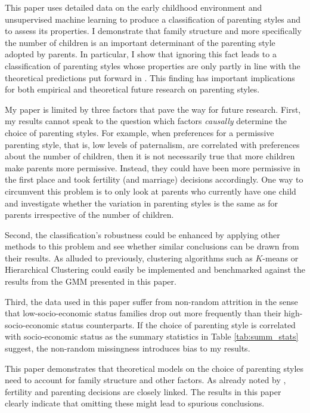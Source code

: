This paper uses detailed data on the early childhood environment and unsupervised machine learning to produce a classification of parenting styles and to assess its properties. I demonstrate that family structure and more specifically the number of children is an important determinant of the parenting style adopted by parents. In particular, I show that ignoring this fact leads to a classification of parenting styles whose properties are only partly in line with the theoretical predictions put forward in \textcites{doepkeParentingStyleAltruism2017}{doepkeEconomicsParenting2019}. This finding has important implications for both empirical and theoretical future research on parenting styles.

My paper is limited by three factors that pave the way for future research. First, my results cannot speak to the question which factors \textit{causally} determine the choice of parenting styles. For example, when preferences for a permissive parenting style, that is, low levels of paternalism, are correlated with preferences about the number of children, then it is not necessarily true that more children make parents more permissive. Instead, they could have been more permissive in the first place and took fertility (and marriage) decisions accordingly. One way to circumvent this problem is to only look at parents who currently have one child and investigate whether the variation in parenting styles is the same as for parents irrespective of the number of children.

Second, the classification's robustness could be enhanced by applying other methods to this problem and see whether similar conclusions can be drawn from their results. As alluded to previously, clustering algorithms such as $K$-means or Hierarchical Clustering could easily be implemented and benchmarked against the results from the GMM presented in this paper.    

Third, the data used in this paper suffer from non-random attrition in the sense that low-socio-economic status families drop out more frequently than their high-socio-economic status counterparts. If the choice of parenting style is correlated with socio-economic status as the summary statistics in Table \ref{tab:summ_stats} suggest, the non-random missingness introduces bias to my results.

This paper demonstrates that theoretical models on the choice of parenting styles need to account for family structure and other factors. As already noted by \textcite{doepkeEconomicsParenting2019}, fertility and parenting decisions are closely linked. The results in this paper clearly indicate that omitting these might lead to spurious conclusions.